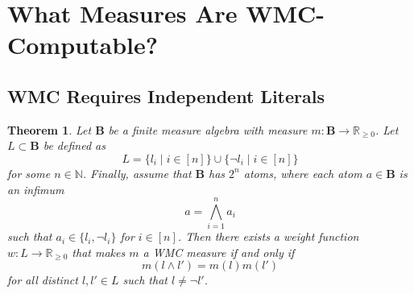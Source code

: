 \documentclass{article}
\newtheorem{theorem}{Theorem}
\theoremstyle{definition}
\theoremstyle{remark}
\begin{document}


\section{What Measures Are WMC-Computable?}



\subsection{WMC Requires Independent Literals}


\begin{theorem}
  Let $\mathbf{B}$ be a finite measure algebra with measure $m\colon \mathbf{B} \to
  \mathbb{R}_{\ge 0}$. Let $L \subset \mathbf{B}$ be defined as
  \[
  L = \{ l_i \mid i \in [n] \} \cup \{ \neg l_i \mid i \in [n] \}
  \]
  for some $n \in \mathbb{N}$. Finally, assume that $\mathbf{B}$ has $2^n$
  atoms, where each atom $a \in \mathbf{B}$ is an infimum
  \[
    a = \bigwedge_{i=1}^n a_i
  \]
  such that $a_i \in \{ l_i, \neg l_i \}$ for $i \in [n]$. Then there exists a
  weight function $w\colon L \to \mathbb{R}_{\ge 0}$ that makes $m$ a WMC measure if
  and only if
  \begin{equation} \label{eq:wmccondition}
  m(l \land l') = m(l)m(l')
  \end{equation}
  for all distinct $l, l' \in L$ such that $l \ne \neg l'$.
\end{theorem}
\end{document}
